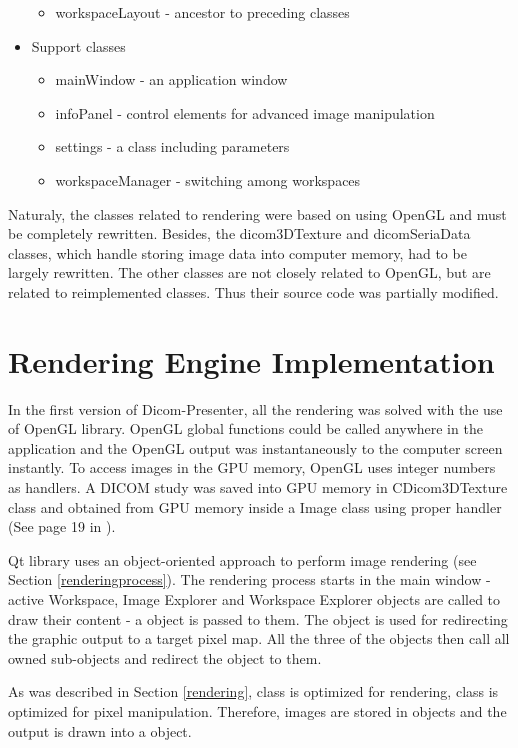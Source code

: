 \begin{itemize}
\begin{itemize}
	\item workspaceLayout - ancestor to preceding classes 
		\end{itemize}
\item Support classes
	\begin{itemize}
	\item mainWindow - an application window
	\item infoPanel - control elements for advanced image manipulation
	\item settings - a class including parameters
	\item workspaceManager - switching among workspaces
	\end{itemize}
\end{itemize}
Naturaly, the classes related to rendering were based on using OpenGL and must be completely rewritten. Besides, the dicom3DTexture and dicomSeriaData classes, which handle storing image data into computer memory, had to be largely rewritten. The other classes are not closely related to OpenGL, but are related to reimplemented classes. Thus their source code was partially modified.





\section{Rendering Engine Implementation}

In the first version of Dicom-Presenter, all the rendering was solved with the use of OpenGL library. OpenGL global functions could be called anywhere in the application and the OpenGL output was instantaneously to the computer screen instantly. To access images in the GPU memory, OpenGL uses integer numbers as handlers. A DICOM study was saved into GPU memory in CDicom3DTexture class and obtained from GPU memory inside a Image class using proper handler (See page 19 in \cite{flaska_bc}).

Qt library uses an object-oriented approach to perform image rendering (see Section \ref{renderingprocess}). The rendering process starts in the main window - active Workspace, Image Explorer and Workspace Explorer objects are called to draw their content - a  object is passed to them. The  object is used for redirecting the graphic output to a target pixel map. All the three of the objects then call all owned sub-objects and redirect the  object to them.

As was described in Section \ref{rendering},  class is optimized for rendering,  class is optimized for pixel manipulation. Therefore, images are stored in  objects and the output is drawn into a  object.

